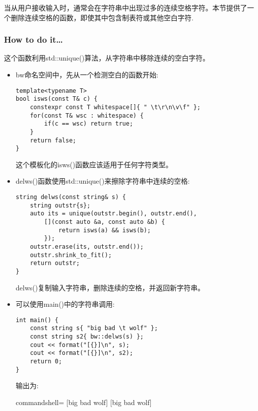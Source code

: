 

当从用户接收输入时，通常会在字符串中出现过多的连续空格字符。本节提供了一个删除连续空格的函数，即使其中包含制表符或其他空白字符.

\subsubsection{How to do it…}

这个函数利用std::unique()算法，从字符串中移除连续的空白字符。

\begin{itemize}
\item 
bw命名空间中，先从一个检测空白的函数开始:

\begin{lstlisting}[style=styleCXX]
template<typename T>
bool isws(const T& c) {
	constexpr const T whitespace[]{ " \t\r\n\v\f" };
	for(const T& wsc : whitespace) {
		if(c == wsc) return true;
	}
	return false;
}
\end{lstlisting}

这个模板化的isws()函数应该适用于任何字符类型。

\item 
delws()函数使用std::unique()来擦除字符串中连续的空格:

\begin{lstlisting}[style=styleCXX]
string delws(const string& s) {
	string outstr{s};
	auto its = unique(outstr.begin(), outstr.end(),
		[](const auto &a, const auto &b) {
			return isws(a) && isws(b);
		});
	outstr.erase(its, outstr.end());
	outstr.shrink_to_fit();
	return outstr;
}
\end{lstlisting}

delws()复制输入字符串，删除连续的空格，并返回新字符串。

\item 
可以使用main()中的字符串调用:

\begin{lstlisting}[style=styleCXX]
int main() {
	const string s{ "big bad \t wolf" };
	const string s2{ bw::delws(s) };
	cout << format("[{}]\n", s);
	cout << format("[{}]\n", s2);
	return 0;
}
\end{lstlisting}

输出为:

\begin{tcblisting}{commandshell={}}
[big     bad                  wolf]
[big bad wolf]
\end{tcblisting}

\end{itemize}

